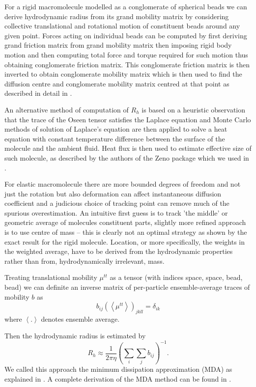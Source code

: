 \documentclass{doctoral}
\begin{document}
For a rigid macromolecule modelled as a conglomerate of spherical beads we can derive hydrodynamic radius from its grand mobility matrix by considering collective translational and rotational motion of constituent beads around any given point.
Forces acting on individual beads can be computed by first deriving grand friction matrix from grand mobility matrix then imposing rigid body motion and then computing total force and torque required for such motion thus obtaining conglomerate friction matrix.
This conglomerate friction matrix is then inverted to obtain conglomerate mobility matrix which is then used to find the diffusion centre and conglomerate mobility matrix centred at that point as described in detail in \cite{Cichocki_2019}.

An alternative method of computation of $R_h$ is based on a heuristic observation that the trace of the Oseen tensor satisfies the Laplace equation and Monte Carlo methods of solution of Laplace's equation are then applied to solve a heat equation with constant temperature difference between the surface of the molecule and the ambient fluid.
Heat flux is then used to estimate effective size of such molecule, as described by the authors of the Zeno package \cite{Juba_2017} which we used in \textcite{Waszkiewicz_2023_dna}.

For elastic macromolecule there are more bounded degrees of freedom and not just the rotation but also deformation can affect instantaneous diffusion coefficient and a judicious choice of tracking point can remove much of the spurious overestimation.
An intuitive first guess is to track 'the middle' or geometric average of molecules constituent parts, slightly more refined approach is to use centre of mass -- this is clearly not an optimal strategy as shown by the exact result for the rigid molecule.
Location, or more specifically, the weights in the weighted average, have to be derived from the hydrodynamic properties rather than from, hydrodynamically irrelevant, mass.

Treating translational mobility $\mu^{tt}$ as a tensor (with indices space, space, bead, bead) we can definite an inverse matrix of per-particle ensemble-average traces of mobility $b$ as
\begin{equation}
    b_{ij} (\left< \mu^{tt} \right> )_{jkll} = \delta_{ik}
\end{equation}
where $\left< .
    \right>$ denotes ensemble average.

Then the hydrodynamic radius is estimated by
\begin{equation}
    R_h \approx \frac{1}{2 \pi \eta} \left( \sum_i \sum_j b_{ij} \right)^{-1}.
\end{equation}
We called this approach the minimum dissipation approximation (MDA) as explained in \textcite{Waszkiewicz_2024_mda}.
A complete derivation of the MDA method can be found in \textcite{Cichocki_2019}.
\end{document}
